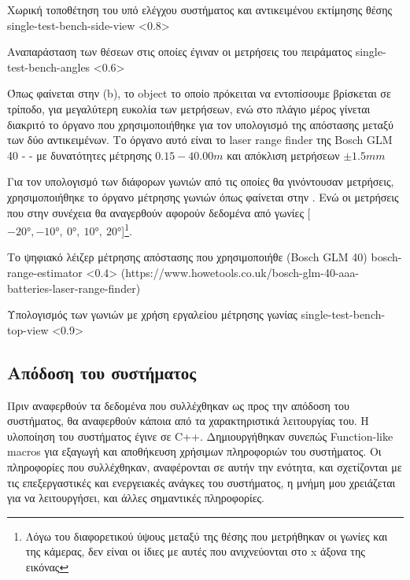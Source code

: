 {Χωρική τοποθέτηση του υπό ελέγχου συστήματος και αντικειμένου εκτίμησης θέσης}%
{single-test-bench-side-view}%
<0.8>

{Αναπαράσταση των θέσεων στις οποίες έγιναν οι μετρήσεις του πειράματος}%
{single-test-bench-angles}%
<0.6>

Όπως φαίνεται στην  (b), το object το οποίο πρόκειται να εντοπίσουμε βρίσκεται σε τρίποδο, για μεγαλύτερη ευκολία των μετρήσεων, ενώ στο πλάγιο μέρος γίνεται διακριτό το όργανο που χρησιμοποιήθηκε για τον υπολογισμό της απόστασης μεταξύ των δύο αντικειμένων. Το όργανο αυτό είναι το laser range finder της Bosch GLM 40 -  - με δυνατότητες μέτρησης $0.15-40.00 m$ και απόκλιση μετρήσεων $\pm1.5mm$

Για τον υπολογισμό των διάφορων γωνιών από τις οποίες θα γινόντουσαν μετρήσεις, χρησιμοποιήθηκε το όργανο μέτρησης γωνιών όπως φαίνεται στην . Ενώ οι μετρήσεις που στην συνέχεια θα αναγερθούν αφορούν δεδομένα από γωνίες [$-20\si{\degree},-10\si{\degree},~0\si{\degree},~10\si{\degree},~20\si{\degree}$]\footnote{Λόγω του διαφορετικού ύψους μεταξύ της θέσης που μετρήθηκαν οι γωνίες και της κάμερας, δεν είναι οι ίδιες με αυτές που ανιχνεύονται στο x άξονα της εικόνας}.

{Το ψηφιακό λέιζερ μέτρησης απόστασης που χρησιμοποιήθε (Bosch GLM 40)}%
{bosch-range-estimator}%
<0.4>%
(https://www.howetools.co.uk/bosch-glm-40-aaa-batteries-laser-range-finder)

{Υπολογισμός των γωνιών με χρήση εργαλείου μέτρησης γωνίας}%
{single-test-bench-top-view}%
<0.9>

\subsection{Απόδοση του συστήματος} \label{sec:single-expe-system}

Πριν αναφερθούν τα δεδομένα που συλλέχθηκαν ως προς την απόδοση του συστήματος, θα αναφερθούν κάποια από τα 
χαρακτηριστικά λειτουργίας του. Η υλοποίηση του συστήματος έγινε σε C++. Δημιουργήθηκαν συνεπώς Function-like macros για εξαγωγή και αποθήκευση χρήσιμων πληροφοριών του συστήματος. Οι πληροφορίες που συλλέχθηκαν, αναφέρονται σε αυτήν την ενότητα, και σχετίζονται με τις επεξεργαστικές και ενεργειακές ανάγκες του συστήματος, η μνήμη μου χρειάζεται για να λειτουργήσει, και άλλες σημαντικές πληροφορίες.

